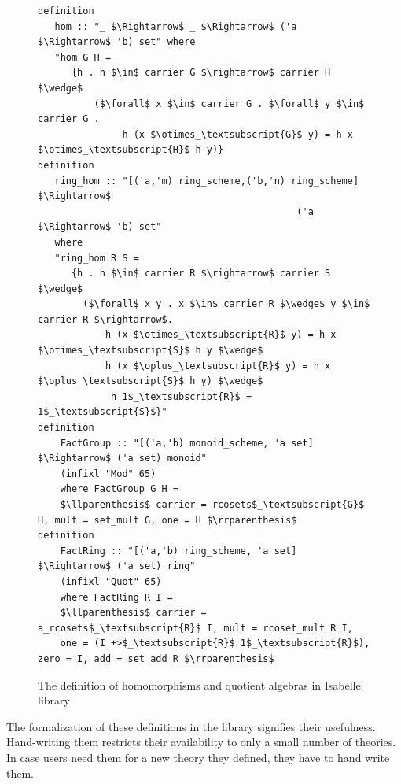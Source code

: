 \begin{figure}
\begin{lstlisting}
definition 
   hom :: "_ $\Rightarrow$ _ $\Rightarrow$ ('a $\Rightarrow$ 'b) set" where 
   "hom G H = 
      {h . h $\in$ carrier G $\rightarrow$ carrier H $\wedge$ 
          ($\forall$ x $\in$ carrier G . $\forall$ y $\in$ carrier G . 
               h (x $\otimes_\textsubscript{G}$ y) = h x $\otimes_\textsubscript{H}$ h y)}
definition 
   ring_hom :: "[('a,'m) ring_scheme,('b,'n) ring_scheme] $\Rightarrow$ 
                                              ('a $\Rightarrow$ 'b) set" 
   where 
   "ring_hom R S = 
      {h . h $\in$ carrier R $\rightarrow$ carrier S $\wedge$ 
        ($\forall$ x y . x $\in$ carrier R $\wedge$ y $\in$ carrier R $\rightarrow$. 
            h (x $\otimes_\textsubscript{R}$ y) = h x $\otimes_\textsubscript{S}$ h y $\wedge$ 
            h (x $\oplus_\textsubscript{R}$ y) = h x $\oplus_\textsubscript{S}$ h y) $\wedge$ 
             h 1$_\textsubscript{R}$ = 1$_\textsubscript{S}$}" 
definition 
    FactGroup :: "[('a,'b) monoid_scheme, 'a set] $\Rightarrow$ ('a set) monoid" 
    (infixl "Mod" 65)
    where FactGroup G H = 
    $\llparenthesis$ carrier = rcosets$_\textsubscript{G}$ H, mult = set_mult G, one = H $\rrparenthesis$
definition 
    FactRing :: "[('a,'b) ring_scheme, 'a set] $\Rightarrow$ ('a set) ring" 
    (infixl "Quot" 65)
    where FactRing R I = 
    $\llparenthesis$ carrier = a_rcosets$_\textsubscript{R}$ I, mult = rcoset_mult R I, 
    one = (I +>$_\textsubscript{R}$ 1$_\textsubscript{R}$), zero = I, add = set_add R $\rrparenthesis$
\end{lstlisting}
	\caption{The definition of homomorphisms and quotient algebras in Isabelle library}
	\label{fig:isabelle_hom_quotient}
\end{figure}
The formalization of these definitions in the library signifies their usefulness. Hand-writing them 
restricts their availability to only a small number of theories. In case users need them for a new theory 
they defined, they have to hand write them. 

